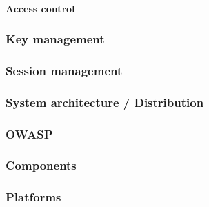 \documentclass[english]{article}
\begin{document}
\paragraph{Access control}

\subsubsection{Key management}

\subsubsection{Session management}

\subsubsection{System architecture / Distribution}

\subsubsection{OWASP}

\subsubsection{Components} \label{components}

  
  \subsubsection{Platforms}





\end{document}
